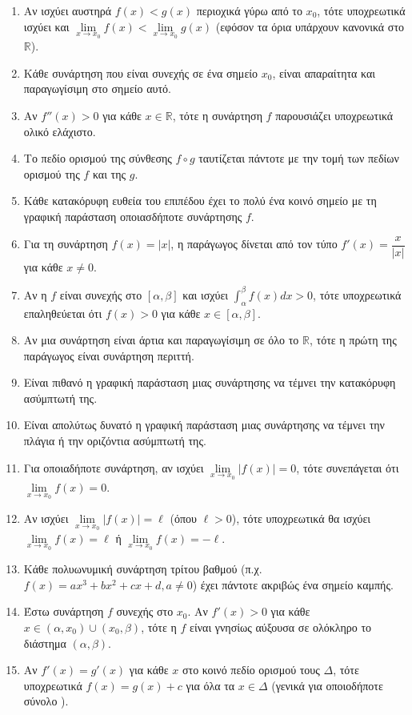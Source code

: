 \documentclass[a4paper,11pt,twoside]{article}
\begin{document}
\begin{enumerate}[label=\textbf{\arabic*.}]
    \item Αν ισχύει αυστηρά $f(x) < g(x)$ περιοχικά γύρω από το $x_0$, τότε υποχρεωτικά ισχύει και $\lim\limits_{x \to x_0} f(x) < \lim\limits_{x \to x_0} g(x)$ (εφόσον τα όρια υπάρχουν κανονικά στο $\mathbb{R}$).
    \item Κάθε συνάρτηση που είναι συνεχής σε ένα σημείο $x_0$, είναι απαραίτητα και παραγωγίσιμη στο σημείο αυτό.
    \item Αν $f''(x) > 0$ για κάθε $x \in \mathbb{R}$, τότε η συνάρτηση $f$ παρουσιάζει υποχρεωτικά ολικό ελάχιστο.
    \item Το πεδίο ορισμού της σύνθεσης $f \circ g$ ταυτίζεται πάντοτε με την τομή των πεδίων ορισμού της $f$ και της $g$.
    \item Κάθε κατακόρυφη ευθεία του επιπέδου έχει το πολύ ένα κοινό σημείο με τη γραφική παράσταση οποιασδήποτε συνάρτησης $f$.
    \item Για τη συνάρτηση $f(x) = |x|$, η παράγωγος δίνεται από τον τύπο $f'(x) = \dfrac{x}{|x|}$ για κάθε $x \ne 0$.
    \item Αν η $f$ είναι συνεχής στο $[\alpha, \beta]$ και ισχύει $\int_\alpha^\beta f(x) dx > 0$, τότε υποχρεωτικά επαληθεύεται ότι $f(x) > 0$ για κάθε $x \in [\alpha, \beta]$.
    \item Αν μια συνάρτηση είναι άρτια και παραγωγίσιμη σε όλο το $\mathbb{R}$, τότε η πρώτη της παράγωγος είναι συνάρτηση περιττή.
    \item Είναι πιθανό η γραφική παράσταση μιας συνάρτησης να τέμνει την κατακόρυφη ασύμπτωτή της.
    \item Είναι απολύτως δυνατό η γραφική παράσταση μιας συνάρτησης να τέμνει την πλάγια ή την οριζόντια ασύμπτωτή της.
    \item Για οποιαδήποτε συνάρτηση, αν ισχύει $\lim\limits_{x \to x_0} |f(x)| = 0$, τότε συνεπάγεται ότι $\lim\limits_{x \to x_0} f(x) = 0$.
    \item Αν ισχύει $\lim\limits_{x \to x_0} |f(x)| = \ell$ (όπου $\ell > 0$), τότε υποχρεωτικά θα ισχύει $\lim\limits_{x \to x_0} f(x) = \ell$ ή $\lim\limits_{x \to x_0} f(x) = -\ell$.
    \item Κάθε πολυωνυμική συνάρτηση τρίτου βαθμού (π.χ. $f(x) = ax^3+bx^2+cx+d, a \ne 0$) έχει πάντοτε ακριβώς ένα σημείο καμπής.
    \item Έστω συνάρτηση $f$ συνεχής στο $x_0$. Αν $f'(x) > 0$ για κάθε $x \in (\alpha, x_0) \cup (x_0, \beta)$, τότε η $f$ είναι γνησίως αύξουσα σε ολόκληρο το διάστημα $(\alpha, \beta)$.
    \item Αν $f'(x) = g'(x)$ για κάθε $x$ στο κοινό πεδίο ορισμού τους $\Delta$, τότε υποχρεωτικά $f(x) = g(x) + c$ για όλα τα $x \in \Delta$ (γενικά για οποιοδήποτε σύνολο \Delta).

\end{enumerate}
\end{document}
